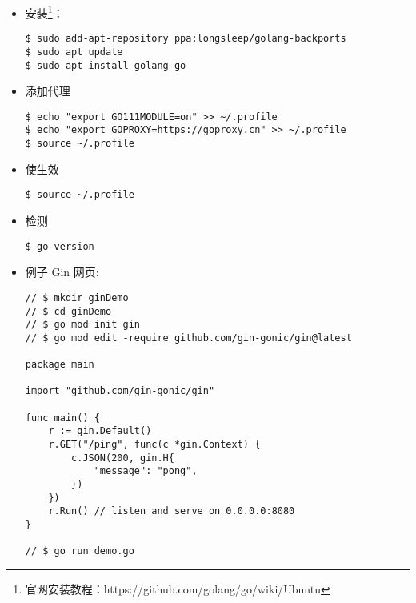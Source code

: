 \begin{itemize}
\item 安装\footnote{官网安装教程：https://github.com/golang/go/wiki/Ubuntu}：
\begin{lstlisting}
$ sudo add-apt-repository ppa:longsleep/golang-backports
$ sudo apt update
$ sudo apt install golang-go
\end{lstlisting}
	
\item 添加代理
\begin{lstlisting}
$ echo "export GO111MODULE=on" >> ~/.profile
$ echo "export GOPROXY=https://goproxy.cn" >> ~/.profile
$ source ~/.profile
\end{lstlisting}

\item 使生效
\begin{lstlisting}
$ source ~/.profile
\end{lstlisting}
	
\item 检测
\begin{lstlisting}
$ go version
\end{lstlisting}

\item 例子 Gin 网页: 

\begin{lstlisting}
// $ mkdir ginDemo
// $ cd ginDemo 
// $ go mod init gin	
// $ go mod edit -require github.com/gin-gonic/gin@latest	
	
package main

import "github.com/gin-gonic/gin"

func main() {
	r := gin.Default()
	r.GET("/ping", func(c *gin.Context) {
		c.JSON(200, gin.H{
			"message": "pong",
		})
	})
	r.Run() // listen and serve on 0.0.0.0:8080
}

// $ go run demo.go 
\end{lstlisting}
\end{itemize}

